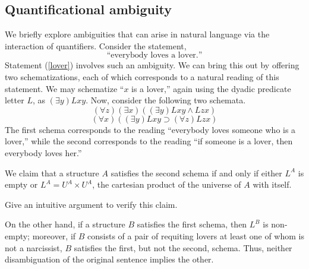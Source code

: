 \subsection*{Quantificational ambiguity}

We briefly explore ambiguities that can arise in natural language via the interaction of quantifiers. Consider the statement, 
\begin{equation}\label{lover}
\mbox{``everybody loves a lover.''} 
\end{equation}
Statement (\ref{lover}) involves such an ambiguity. We can bring this out by offering two schematizations, each of which corresponds to a natural reading of this statement. 
We may schematize ``$x$ is a lover,'' again using the dyadic predicate letter $L$, as $(\exists y)Lxy$.%
Now, consider the following two schemata.
\[(\forall z)(\exists x)((\exists y)Lxy\wedge Lzx)\]
\[(\forall x)((\exists y)Lxy\supset (\forall z)Lzx)\]
The first schema corresponds to the reading ``everybody loves someone who is a lover,'' while the second corresponds to the reading ``if someone is a lover, then everybody loves her.''
\iffalse
There are two natural %
readings of that sentence. There are only two \emph{reasonable} ones} readings of the sentence ``everybody loves a lover'': either we interpret it as ``everybody loves someone who is a lover'', and ``if someone is a lover, then everybody loves her''. Corresponding to these two interpretations, we have the respective schematizations:

\[(\forall z)(\exists x)((\exists y)Lxy\wedge Lzx)\footnote{A decent reading of this schematization is ``for every person $z$, there is a person $x$ such that $z$ loves $x$ and there is a $y$ that $x$ loves''.}\] 
and 
\[(\forall x)((\exists y)Lxy\supset (\forall z)Lzx)\]
\fi

We claim that a structure $A$ satisfies the second schema if and only if either $L^A$ is empty or $L^A=U^A\times U^A$, the cartesian product of the universe of $A$ with itself. 

\begin{aside}
    Give an intuitive argument to verify this claim. 
\end{aside}

On the other hand, if a structure $B$ satisfies the first schema, then $L^B$ is non-empty; moreover, if $B$ consists of a pair of requiting lovers at least one of whom is not a narcissist, $B$ satisfies the first, but not the second, schema. Thus, neither disambiguation of the original sentence implies the other.
\iffalse
\begin{aside}
    Give two different schematizations of the sentence ``all that glitters is not gold'', corresponding to two different interpretations of the scope of the negation ``not''. 
\end{aside}
\fi